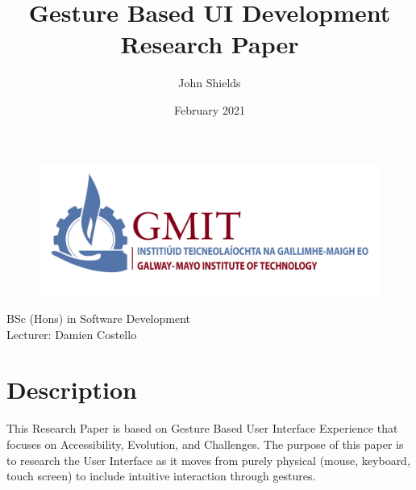 \documentclass{article}
\title{\huge{\textbf{Gesture Based UI Development}} \\
\LARGE{Research Paper}}
\author{John Shields}
\date{February 2021}
\begin{document}
\clearpage\maketitle
\thispagestyle{empty}
\begin{center}
    \begin{figure}[h]
        \centering
        \includegraphics[width=15cm]{pics/logo-gmit.png}
        \label{fig:logo}
    \end{figure}
    \large{	BSc (Hons) in Software Development \\
    Lecturer: Damien Costello}
\end{center}
\newpage
\setcounter{page}{1}
\tableofcontents
\listoffigures

\newpage
{} %

\section{Description}
This Research Paper is based on Gesture Based User Interface Experience that focuses on Accessibility, Evolution, and Challenges. The purpose of this paper is to research the User Interface as it moves from purely physical (mouse, keyboard, touch screen) to include intuitive interaction through gestures.
\end{document}
